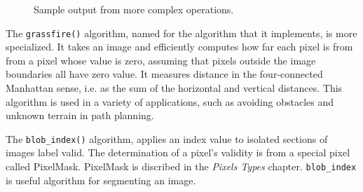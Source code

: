 \begin{figure}[hp]
\centering
  \hfill
  \hfill
  \hfill
\caption{Sample output from more complex operations.}
\label{fig:complex}
\end{figure}

The \verb#grassfire()# algorithm, named for the algorithm that
it implements, is more specialized.  It takes an image and
efficiently computes how far each pixel is from from a pixel
whose value is zero, assuming that pixels outside the image
boundaries all have zero value.  It measures distance in the
four-connected Manhattan sense, i.e. as the sum of the
horizontal and vertical distances.  This algorithm is used in
a variety of applications, such as avoiding obstacles and
unknown terrain in path planning.

The \verb#blob_index()# algorithm, applies an index value to isolated
sections of images label valid. The determination of a pixel's
validity is from a special pixel called PixelMask. PixelMask is
discribed in the \emph{Pixels Types} chapter. \verb#blob_index# is
useful algorithm for segmenting an image.




